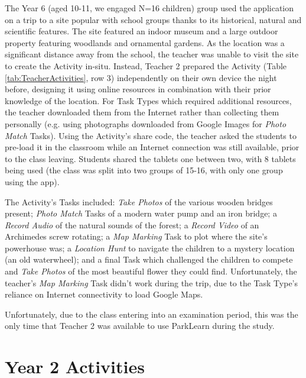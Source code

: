 The Year 6 (aged 10-11, we engaged N=16 children) group used the application on a trip to a site popular with school groups thanks to its historical, natural and scientific features. The site featured an indoor museum and a large outdoor property featuring woodlands and ornamental gardens. As the location was a significant distance away from the school, the teacher was unable to visit the site to create the Activity in-situ. Instead, Teacher 2 prepared the Activity (Table \ref{tab:TeacherActivities}, row 3) independently on their own device the night before, designing it using online resources in combination with their prior knowledge of the location. For Task Types which required additional resources, the teacher downloaded them from the Internet rather than collecting them personally (e.g. using photographs downloaded from Google Images for \textit{Photo Match} Tasks). Using the Activity's share code, the teacher asked the students to pre-load it in the classroom while an Internet connection was still available, prior to the class leaving. Students shared the tablets one between two, with 8 tablets being used (the class was split into two groups of 15-16, with only one group using the app). 

The Activity's Tasks included: \textit{Take Photos} of the various wooden bridges present; \textit{Photo Match} Tasks of a modern water pump and an iron bridge; a \textit{Record Audio} of the natural sounds of the forest; a \textit{Record Video} of an Archimedes screw rotating; a \textit{Map Marking} Task to plot where the site's powerhouse was; a \textit{Location Hunt} to navigate the children to a mystery location (an old waterwheel); and a final Task which challenged the children to compete and \textit{Take Photos} of the most beautiful flower they could find. Unfortunately, the teacher's \textit{Map Marking} Task didn't work during the trip, due to the Task Type's reliance on Internet connectivity to load Google Maps.

Unfortunately, due to the class entering into an examination period, this was the only time that Teacher 2 was available to use ParkLearn during the study.

\section{Year 2 Activities}

